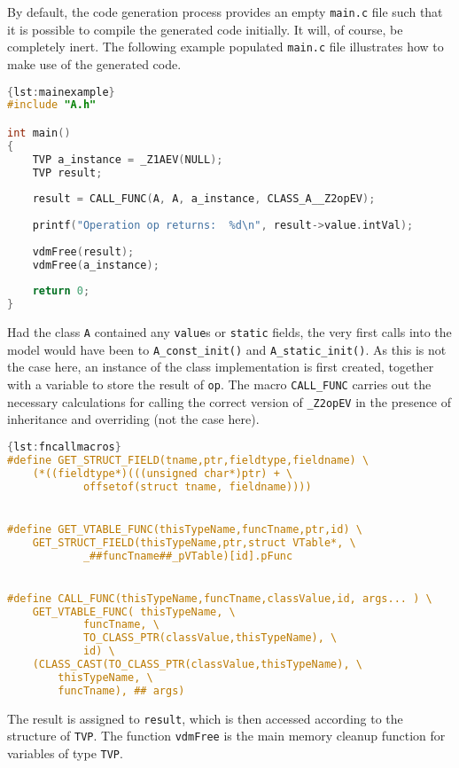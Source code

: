 By default, the code generation process provides an empty \texttt{main.c} file such that it is possible to compile the generated code initially.
%
It will, of course, be completely inert.
%
The following example populated \texttt{main.c} file illustrates how to make use of the generated code.
%
%
%
\begin{lstlisting}[language=C,caption={Example \texttt{main.c} file.},label={lst:mainexample},frame=tlbr]{lst:mainexample}
#include "A.h"

int main()
{
	TVP a_instance = _Z1AEV(NULL);
	TVP result;
	
	result = CALL_FUNC(A, A, a_instance, CLASS_A__Z2opEV);
	
	printf("Operation op returns:  %d\n", result->value.intVal);
	
	vdmFree(result);
	vdmFree(a_instance);
	
	return 0;
}
\end{lstlisting}
%
%
%
Had the class \texttt{A} contained any \texttt{value}s or \texttt{static} fields, the very first calls into the model would have been to \texttt{A\_\allowbreak{}const\_\allowbreak{}init()} and \texttt{A\_\allowbreak{}static\_\allowbreak{}init()}.
%
As this is not the case here, an instance of the class implementation is first created, together with a variable to store the result of \texttt{op}.
%
The macro \texttt{CALL\_FUNC} carries out the necessary calculations for calling the correct version of \texttt{\_Z2opEV} in the presence of inheritance and overriding (not the case here).
%
%
%
\begin{lstlisting}[language=C,caption={Macros supporting function calls.},label={lst:fncallmacros},frame=tlbr]{lst:fncallmacros}
#define GET_STRUCT_FIELD(tname,ptr,fieldtype,fieldname) \
	(*((fieldtype*)(((unsigned char*)ptr) + \
			offsetof(struct tname, fieldname))))


#define GET_VTABLE_FUNC(thisTypeName,funcTname,ptr,id) \
	GET_STRUCT_FIELD(thisTypeName,ptr,struct VTable*, \
			_##funcTname##_pVTable)[id].pFunc


#define CALL_FUNC(thisTypeName,funcTname,classValue,id, args... ) \
	GET_VTABLE_FUNC( thisTypeName, \
			funcTname, \
			TO_CLASS_PTR(classValue,thisTypeName), \
			id) \
	(CLASS_CAST(TO_CLASS_PTR(classValue,thisTypeName), \
		thisTypeName, \
		funcTname), ## args)
\end{lstlisting}
%
%
%
The result is assigned to \texttt{result}, which is then accessed according to the structure of \texttt{TVP}.
%
The function \texttt{vdmFree} is the main memory cleanup function for variables of type \texttt{TVP}.
%
%
%
